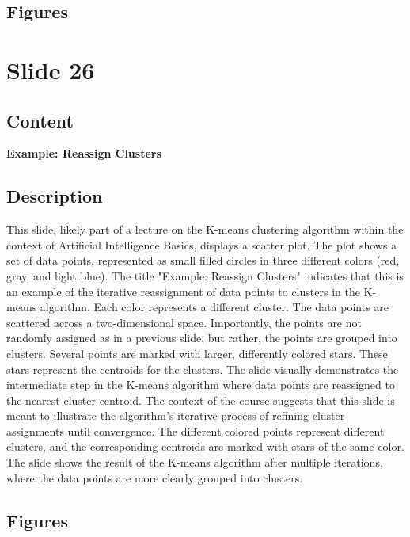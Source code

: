 \documentclass{article}%
\begin{document}
\subsection{Figures}%
\begin{figure}[H]%
\centering%
\end{figure}

%
\newpage%
\section{Slide 26}%
\label{sec:Slide26}%
\subsection{Content}%

\textbf{Example: Reassign Clusters}
%
\subsection{Description}%
This slide, likely part of a lecture on the K-means clustering algorithm within the context of Artificial Intelligence Basics, displays a scatter plot.  The plot shows a set of data points, represented as small filled circles in three different colors (red, gray, and light blue).  The title "Example: Reassign Clusters" indicates that this is an example of the iterative reassignment of data points to clusters in the K-means algorithm.  Each color represents a different cluster.  The data points are scattered across a two-dimensional space.  Importantly, the points are not randomly assigned as in a previous slide, but rather, the points are grouped into clusters.  Several points are marked with larger, differently colored stars.  These stars represent the centroids for the clusters.  The slide visually demonstrates the intermediate step in the K-means algorithm where data points are reassigned to the nearest cluster centroid.  The context of the course suggests that this slide is meant to illustrate the algorithm's iterative process of refining cluster assignments until convergence.  The different colored points represent different clusters, and the corresponding centroids are marked with stars of the same color.  The slide shows the result of the K-means algorithm after multiple iterations, where the data points are more clearly grouped into clusters.%
\subsection{Figures}%
\begin{figure}[H]%
\centering%
\end{figure}
\end{document}
